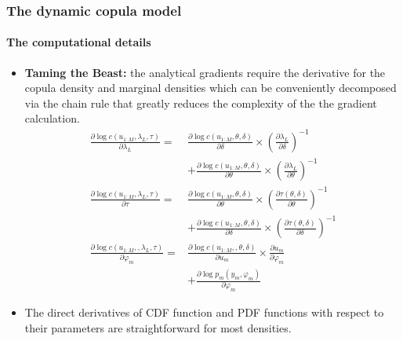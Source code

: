 \documentclass{beamer}
\begin{document}
\begin{frame}[allowframebreaks]
  \frametitle{The dynamic copula model}
  \framesubtitle{The computational details}
  \begin{itemize}

  \item \textbf{Taming the Beast:} the analytical gradients require the derivative for the
    copula density and marginal densities which can be conveniently decomposed via the
    chain rule that greatly reduces the complexity of the the gradient calculation.
    {\footnotesize
      \begin{align*}
        \frac{\partial\log c(u_{1:M},\lambda_{L},\tau)}{\partial\lambda_{L}}= & \frac{\partial\log c(u_{1:M},\theta,\delta)}{\partial\delta}\times\left(\frac{\partial\lambda_{L}}{\partial\delta}\right)^{-1}\\
                                                                              &+\frac{\partial\log c(u_{1:M},\theta,\delta)}{\partial\theta}\times\left(\frac{\partial\lambda_{L}}{\partial\theta}\right)^{-1}\\
        \frac{\partial\log c(u_{1:M},\lambda_{L},\tau)}{\partial\tau}= &
                                                                         \frac{\partial\log c(u_{1:M},\theta,\delta)}{\partial\theta}\times\left(\frac{\partial\tau(\theta,\delta)}{\partial\theta}\right)^{-1}\\
                                                                              & +                                                                           \frac{\partial\log c(u_{1:M},\theta,\delta)}{\partial\delta}\times\left(\frac{\partial\tau(\theta,\delta)}{\partial\delta}\right)^{-1}\\
        \frac{\partial\log c(u_{1:M},,\lambda_{L},\tau)}{\partial\varphi_{m}}= &
                                                                                 \frac{\partial\log c(u_{1:M},,\theta,\delta)}{\partial u_{m}}\times\frac{\partial
                                                                                 u_{m}}{\partial\varphi_m}\\ &+ \frac{\partial \log
                                                                                                               p_m(y_m,\varphi_m)}{\partial \varphi_m}
      \end{align*}
    }

  \item The direct derivatives of CDF function and PDF functions with respect to their
    parameters are straightforward for most densities.


\end{itemize}
\end{frame}
\end{document}
